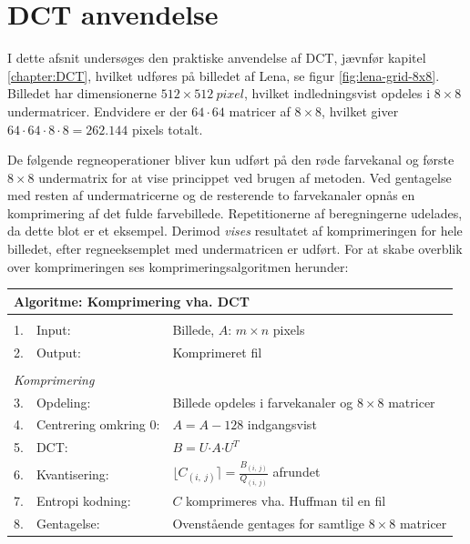 \section{DCT anvendelse} \label{sec:DCTAnvendelse}
I dette afsnit undersøges den praktiske anvendelse af DCT, jævnfør kapitel \ref{chapter:DCT}, hvilket udføres på billedet af Lena, se figur \vref{fig:lena-grid-8x8}. Billedet har dimensionerne $ 512 \times \SI{512}{pixel}$, hvilket indledningsvist opdeles i $8 \times 8$ undermatricer. Endvidere er der $ 64 \cdot 64$ matricer af $8 \times 8$, hvilket giver $64 \cdot 64 \cdot 8 \cdot 8 = 262.144$ pixels totalt.

De følgende regneoperationer bliver kun udført på den røde farvekanal og første $8 \times 8$ undermatrix for at vise princippet ved brugen af metoden. Ved gentagelse med resten af undermatricerne og de resterende to farvekanaler opnås en komprimering af det fulde farvebillede. Repetitionerne af beregningerne udelades, da dette blot er et eksempel. Derimod \textit{vises} resultatet af komprimeringen for hele billedet, efter regneeksemplet med undermatricen er udført. For at skabe overblik over komprimeringen ses komprimeringsalgoritmen herunder:
\begin{table}[!h]
\centering
\begin{tabular}{lll}
\hline
\multicolumn{3}{l}{\textbf{Algoritme: Komprimering vha. DCT}}                           \\ \hline
\\
\multicolumn{1}{|l}{1.}        & Input:                     & Billede, $A$: $m \times n$ pixels             \\
\multicolumn{1}{|l}{2.}        & Output:                    & Komprimeret fil       \\
                               &                            &                        \\
\multicolumn{2}{|l}{\textit{Komprimering}}                  &                        \\
\multicolumn{1}{|l}{3.}        & Opdeling:                  & Billede opdeles i farvekanaler og $8 \times 8$ matricer \\
\multicolumn{1}{|l}{4.}        & Centrering omkring 0:      & $A = A - 128$ indgangsvist    \\
\multicolumn{1}{|l}{5.}        & DCT:              & $B = U \boldsymbol{\cdot} A \boldsymbol{\cdot} U^T$  \\
\multicolumn{1}{|l}{6.}        & Kvantisering:              & $\lfloor C_{(i,\ j)} \rceil = \frac{B_{(i,\ j)}}{Q_{(i,\ j)}}$ afrundet\\
\multicolumn{1}{|l}{7.}        & Entropi kodning:           & $C$ komprimeres vha. Huffman til en fil              \\
\multicolumn{1}{|l}{8.}        & Gentagelse:                & Ovenstående gentages for samtlige $8 \times 8$ matricer\\
\end{tabular}
\label{tb:Algoritme-Komprimering-DCT}
\end{table}

